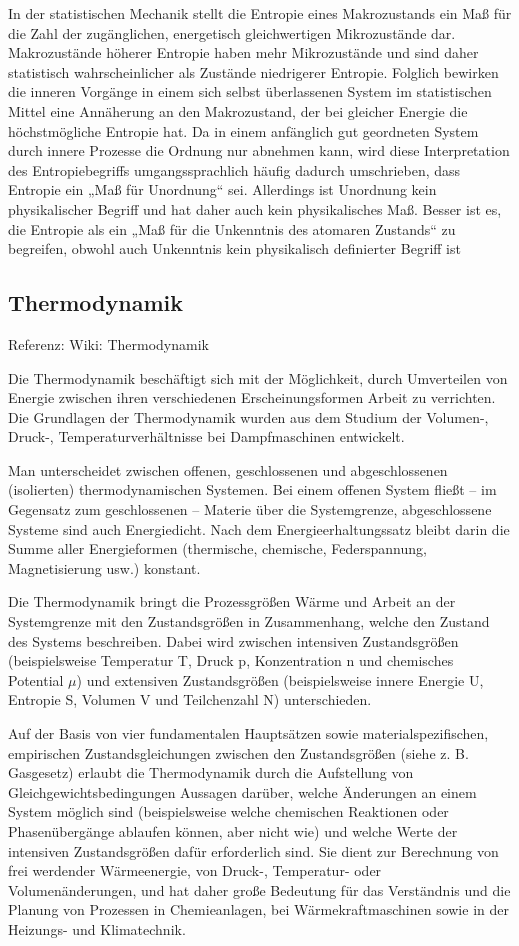 \documentclass[]{article}
\begin{document}
In der statistischen Mechanik stellt die Entropie eines Makrozustands ein Maß für die Zahl der zugänglichen, energetisch gleichwertigen Mikrozustände dar. Makrozustände höherer Entropie haben mehr Mikrozustände und sind daher statistisch wahrscheinlicher als Zustände niedrigerer Entropie. Folglich bewirken die inneren Vorgänge in einem sich selbst überlassenen System im statistischen Mittel eine Annäherung an den Makrozustand, der bei gleicher Energie die höchstmögliche Entropie hat. Da in einem anfänglich gut geordneten System durch innere Prozesse die Ordnung nur abnehmen kann, wird diese Interpretation des Entropiebegriffs umgangssprachlich häufig dadurch umschrieben, dass Entropie ein „Maß für Unordnung“ sei. Allerdings ist Unordnung kein physikalischer Begriff und hat daher auch kein physikalisches Maß. Besser ist es, die Entropie als ein „Maß für die Unkenntnis des atomaren Zustands“ zu begreifen, obwohl auch Unkenntnis kein physikalisch definierter Begriff ist

\subsection{Thermodynamik}
Referenz: Wiki: Thermodynamik

Die Thermodynamik beschäftigt sich mit der Möglichkeit, durch Umverteilen von Energie zwischen ihren verschiedenen Erscheinungsformen Arbeit zu verrichten. Die Grundlagen der Thermodynamik wurden aus dem Studium der Volumen-, Druck-, Temperaturverhältnisse bei Dampfmaschinen entwickelt.

Man unterscheidet zwischen offenen, geschlossenen und abgeschlossenen (isolierten) thermodynamischen Systemen. Bei einem offenen System fließt – im Gegensatz zum geschlossenen – Materie über die Systemgrenze, abgeschlossene Systeme sind auch Energiedicht. Nach dem Energieerhaltungssatz bleibt darin die Summe aller Energieformen (thermische, chemische, Federspannung, Magnetisierung usw.) konstant.

Die Thermodynamik bringt die Prozessgrößen Wärme und Arbeit an der Systemgrenze mit den Zustandsgrößen in Zusammenhang, welche den Zustand des Systems beschreiben. Dabei wird zwischen intensiven Zustandsgrößen (beispielsweise Temperatur T, Druck p, Konzentration n und chemisches Potential $\mu$) und extensiven Zustandsgrößen (beispielsweise innere Energie U, Entropie S, Volumen V und Teilchenzahl N) unterschieden.

Auf der Basis von vier fundamentalen Hauptsätzen sowie materialspezifischen, empirischen Zustandsgleichungen zwischen den Zustandsgrößen (siehe z. B. Gasgesetz) erlaubt die Thermodynamik durch die Aufstellung von Gleichgewichtsbedingungen Aussagen darüber, welche Änderungen an einem System möglich sind (beispielsweise welche chemischen Reaktionen oder Phasenübergänge ablaufen können, aber nicht wie) und welche Werte der intensiven Zustandsgrößen dafür erforderlich sind. Sie dient zur Berechnung von frei werdender Wärmeenergie, von Druck-, Temperatur- oder Volumenänderungen, und hat daher große Bedeutung für das Verständnis und die Planung von Prozessen in Chemieanlagen, bei Wärmekraftmaschinen sowie in der Heizungs- und Klimatechnik.
\end{document}
